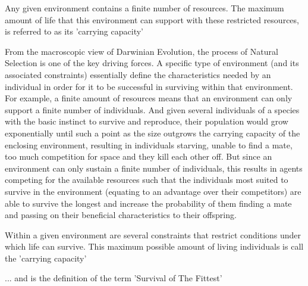 Any given environment contains a finite number of resources. The maximum amount of life that this environment can support with these restricted resources, is referred to as its 'carrying capacity'

From the macroscopic view of Darwinian Evolution, the process of Natural Selection is one of the key driving forces. A specific type of environment (and its associated constraints) essentially define the characteristics needed by an individual in order for it to be successful in surviving within that environment. For example, a finite amount of resources means that an environment can only support a finite number of individuals. And given several individuals of a species with the basic instinct to survive and reproduce, their population would grow exponentially until such a point as the size outgrows the carrying capacity of the enclosing environment, resulting in individuals starving, unable to find a mate, too much competition for space and they kill each other off. But since an environment can only sustain a finite number of individuals, this results in agents competing for the available resources such that the individuals most suited to survive in the environment (equating to an advantage over their competitors) are able to survive the longest and increase the probability of them finding a mate and passing on their beneficial characteristics to their offspring.


Within a given environment are several constraints that restrict conditions under which life can survive. This maximum possible amount of living individuals is call the 'carrying capacity'

... and is the definition of the term 'Survival of The Fittest'





